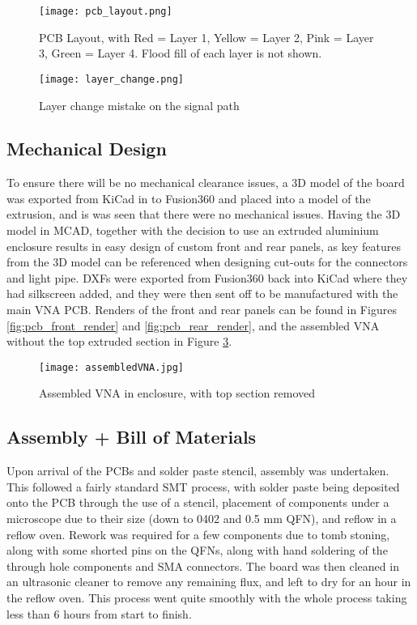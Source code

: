 \begin{landscape}
	\begin{figure}
		\centering
		\texttt{[image: pcb\_layout.png]}
		\caption{PCB Layout, with Red = Layer 1, Yellow = Layer 2, Pink = Layer 3, Green = Layer 4. Flood fill of each layer is not shown.}
		\label{fig:pcb_layout}
	\end{figure}
\end{landscape}

\begin{figure}[H]
	\centering
	\texttt{[image: layer\_change.png]}
	\caption{Layer change mistake on the signal path}
	\label{fig:pcb_layer_change}
\end{figure}

\subsection{Mechanical Design}
To ensure there will be no mechanical clearance issues, a 3D model of the board was exported from KiCad in to Fusion360 and placed into a model of the extrusion, and is was seen that there were no mechanical issues. Having the 3D model in MCAD, together with the decision to use an extruded aluminium enclosure results in easy design of custom front and rear panels, as key features from the 3D model can be referenced when designing cut-outs for the connectors and light pipe. DXFs were exported from Fusion360 back into KiCad where they had silkscreen added, and they were then sent off to be manufactured with the main VNA PCB. Renders of the front and rear panels can be found in Figures \ref{fig:pcb_front_render} and \ref{fig:pcb_rear_render}, and the assembled VNA without the top extruded section in Figure \ref{fig:pcb_assembled}.

\begin{figure}[H]
	\centering
	\texttt{[image: assembledVNA.jpg]}
	\caption{Assembled VNA in enclosure, with top section removed}
	\label{fig:pcb_assembled}
\end{figure}

\subsection{Assembly + Bill of Materials}
Upon arrival of the PCBs and solder paste stencil, assembly was undertaken. This followed a fairly standard SMT process, with solder paste being deposited onto the PCB through the use of a stencil, placement of components under a microscope due to their size (down to 0402 and 0.5 mm QFN), and reflow in a reflow oven. Rework was required for a few components due to tomb stoning, along with some shorted pins on the QFNs, along with hand soldering of the through hole components and SMA connectors. The board was then cleaned in an ultrasonic cleaner to remove any remaining flux, and left to dry for an hour in the reflow oven. This process went quite smoothly with the whole process taking less than 6 hours from start to finish. 

